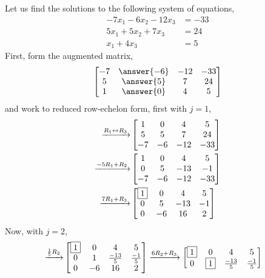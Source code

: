 \documentclass{ximera}
\begin{document}
\begin{example}
  Let us find the solutions to the following system of equations,
  \begin{align*}
    -7x_1 -6 x_2 - 12x_3 &=-33\\
    5x_1  + 5x_2 + 7x_3 &=24\\
    x_1 +4x_3 &=5
  \end{align*}
  First, form the augmented matrix,
  \[
    \begin{bmatrix}
      -7&\answer{-6}&- 12&-33\\
      5&\answer{5}&7&24\\
      1&\answer{0}&4&5
    \end{bmatrix}
  \]
  and work to reduced row-echelon form, first with $j=1$,
  \begin{align*}
    \xrightarrow{R_{1}\leftrightarrow R_{3}}
    &
      \begin{bmatrix}
        1&0&4&5\\
        5&5&7&24\\
        -7&-6&-12&-33
      \end{bmatrix} \\
    \xrightarrow{-5R_{1}+R_{2}}
    & \begin{bmatrix}
      1&0&4&5\\
      0&5&-13&-1\\
      -7&-6&-12&-33
    \end{bmatrix}\\
    \xrightarrow{7R_{1}+R_{3}}
    &
      \begin{bmatrix}
        \fbox{1}&0&4&5\\
        0&5&-13&-1\\
        0&-6&16&2
      \end{bmatrix}
  \end{align*}
  Now, with $j=2$,
  \begin{align*}
    \xrightarrow{\frac{1}{5}R_{2}}
    &
      \begin{bmatrix}
        \fbox{1}&0&4&5\\
        0&1&\frac{-13}{5}&\frac{-1}{5}\\
        0&-6&16&2
      \end{bmatrix}
                 \xrightarrow{6R_{2}+R_{3}}
                 \begin{bmatrix}
                   \fbox{1}&0&4&5\\
                   0&\fbox{1}&\frac{-13}{5}&\frac{-1}{5}\\

\end{bmatrix}
\end{align*}
\end{example}
\end{document}
